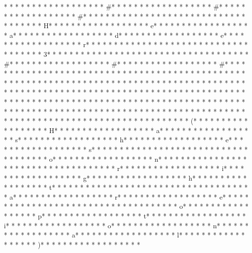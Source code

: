 * * *  * * *  * * *  *  * * *  *  * * *  * #* * *  * * *  * * *  *  * * *  *  * * *  * #* * *  * * *  * * *  *  * * *  *  * * *  * #* * *  * * *  * * *  *  * * *  *  * * *  *  * * *  * * *  * * *  *  * * *  *  * * *  * H* * *  * * *  * * *  *  * * *  *  * * *  * e* * *  * * *  * * *  *  * * *  *  * * *  * a* * *  * * *  * * *  *  * * *  *  * * *  * d* * *  * * *  * * *  *  * * *  *  * * *  * e* * *  * * *  * * *  *  * * *  *  * * *  * r* * *  * * *  * * *  *  * * *  *  * * *  *  * * *  * * *  * * *  *  * * *  *  * * *  * 3* * *  * * *  * * *  *  * * *  *  * * *  *  * * *  * * *  * * *  *  * * *  *  * * *  * #* * *  * * *  * * *  *  * * *  *  * * *  * #* * *  * * *  * * *  *  * * *  *  * * *  * #* * *  * * *  * * *  *  * * *  *  * * *  *  * * *  * * *  * * *  *  * * *  *  * * *  *  * * *  * * *  * * *  *  * * *  *  * * *  *  * * *  * * *  * * *  *  * * *  *  * * *  *  * * *  * * *  * * *  *  * * *  *  * * *  *  * * *  * * *  * * *  *  * * *  *  * * *  *  * * *  * * *  * * *  *  * * *  *  * * *  *  * * *  * * *  * * *  *  * * *  *  * * *  *  * * *  * * *  * * *  *  * * *  *  * * *  *  * * *  * * *  * * *  *  * * *  *  * * *  *  * * *  * * *  * * *  *  * * *  *  * * *  *  * * *  * * *  * * *  *  * * *  *  * * *  *  * * *  * * *  * * *  *  * * *  *  * * *  *  * * *  * * *  * * *  *  * * *  *  * * *  * (* * *  * * *  * * *  *  * * *  *  * * *  * H* * *  * * *  * * *  *  * * *  *  * * *  * a* * *  * * *  * * *  *  * * *  *  * * *  * s* * *  * * *  * * *  *  * * *  *  * * *  * h* * *  * * *  * * *  *  * * *  *  * * *  * e* * *  * * *  * * *  *  * * *  *  * * *  * s* * *  * * *  * * *  *  * * *  *  * * *  *  * * *  * * *  * * *  *  * * *  *  * * *  * o* * *  * * *  * * *  *  * * *  *  * * *  * n* * *  * * *  * * *  *  * * *  *  * * *  *  * * *  * * *  * * *  *  * * *  *  * * *  * r* * *  * * *  * * *  *  * * *  *  * * *  * i* * *  * * *  * * *  *  * * *  *  * * *  * g* * *  * * *  * * *  *  * * *  *  * * *  * h* * *  * * *  * * *  *  * * *  *  * * *  * t* * *  * * *  * * *  *  * * *  *  * * *  *  * * *  * * *  * * *  *  * * *  *  * * *  * a* * *  * * *  * * *  *  * * *  *  * * *  * r* * *  * * *  * * *  *  * * *  *  * * *  * e* * *  * * *  * * *  *  * * *  *  * * *  *  * * *  * * *  * * *  *  * * *  *  * * *  * o* * *  * * *  * * *  *  * * *  *  * * *  * p* * *  * * *  * * *  *  * * *  *  * * *  * t* * *  * * *  * * *  *  * * *  *  * * *  * i* * *  * * *  * * *  *  * * *  *  * * *  * o* * *  * * *  * * *  *  * * *  *  * * *  * n* * *  * * *  * * *  *  * * *  *  * * *  * a* * *  * * *  * * *  *  * * *  *  * * *  * l* * *  * * *  * * *  *  * * *  *  * * *  * )* * *  * * *  * * *  *  * * *  *  * * *  * 
